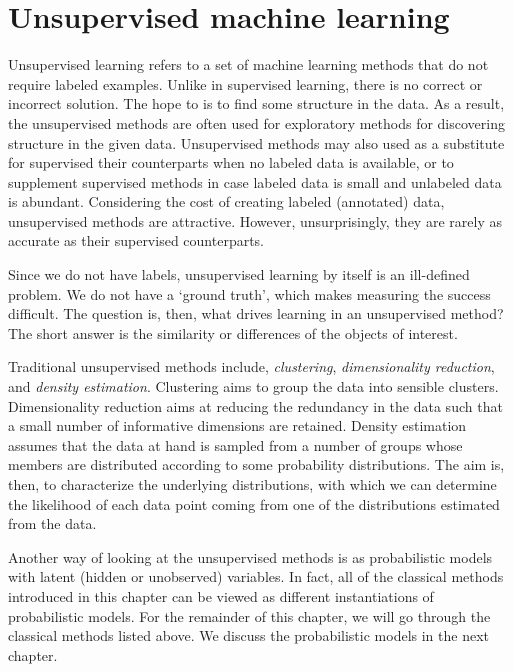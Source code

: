 \chapter{\label{chap:unsupervised-ml}Unsupervised machine learning}

Unsupervised learning refers to a set of machine learning methods
that do not require labeled examples.
Unlike in supervised learning,
there is no correct or incorrect solution.
The hope to is to find some structure in the data.
As a result,
the unsupervised methods are often used for exploratory methods
for discovering structure in the given data. 
Unsupervised methods may also used 
as a substitute for supervised their counterparts
when no labeled data is available,
or to supplement supervised methods
in case labeled data is small and unlabeled data is abundant.
Considering the cost of creating labeled (annotated) data,
unsupervised methods are attractive.
However, unsurprisingly,
they are rarely as accurate as their supervised counterparts.


Since we do not have labels,
unsupervised learning by itself is an ill-defined problem.
We do not have a `ground truth',
which makes measuring the success difficult.
The question is, then, 
what drives learning in an unsupervised method?
The short answer is 
the similarity or differences
of the objects of interest.

Traditional unsupervised methods include,
\emph{clustering},
\emph{dimensionality reduction},
and \emph{density estimation}.
Clustering aims to group the data into sensible clusters.
Dimensionality reduction aims at reducing the redundancy
in the data such that a small number of informative dimensions are retained.
Density estimation assumes that the data at hand is sampled from a number of
groups whose members are distributed
according to some probability distributions.
The aim is, then, to characterize the underlying distributions,
with which we can determine the likelihood of each data point coming from
one of the distributions estimated from the data.

Another way of looking at the unsupervised methods is
as probabilistic models with latent (hidden or unobserved) variables.
In fact,
all of the classical methods introduced in this chapter can be viewed
as different instantiations of probabilistic models.
For the remainder of this chapter,
we will go through the classical methods listed above.
We discuss the probabilistic models in the next chapter.

